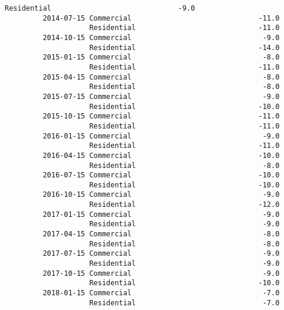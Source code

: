 \documentclass[11pt]{article}
\begin{document}
\begin{Verbatim}[commandchars=\\\{\}]
                    Residential                              -9.0   
         2014-07-15 Commercial                              -11.0   
                    Residential                             -11.0   
         2014-10-15 Commercial                               -9.0   
                    Residential                             -14.0   
         2015-01-15 Commercial                               -8.0   
                    Residential                             -11.0   
         2015-04-15 Commercial                               -8.0   
                    Residential                              -8.0   
         2015-07-15 Commercial                               -9.0   
                    Residential                             -10.0   
         2015-10-15 Commercial                              -11.0   
                    Residential                             -11.0   
         2016-01-15 Commercial                               -9.0   
                    Residential                             -11.0   
         2016-04-15 Commercial                              -10.0   
                    Residential                              -8.0   
         2016-07-15 Commercial                              -10.0   
                    Residential                             -10.0   
         2016-10-15 Commercial                               -9.0   
                    Residential                             -12.0   
         2017-01-15 Commercial                               -9.0   
                    Residential                              -9.0   
         2017-04-15 Commercial                               -8.0   
                    Residential                              -8.0   
         2017-07-15 Commercial                               -9.0   
                    Residential                              -9.0   
         2017-10-15 Commercial                               -9.0   
                    Residential                             -10.0   
         2018-01-15 Commercial                               -7.0   
                    Residential                              -7.0   
         

\end{Verbatim}
\end{document}
